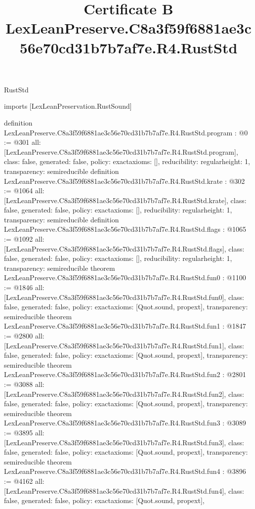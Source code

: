 \begin{lexlean}{RustStd}
\title{Certificate B LexLeanPreserve.C8a3f59f6881ae3c56e70cd31b7b7af7e.R4.RustStd}
\begin{coremodule}
imports [LexLeanPreservation.RustSound]

definition LexLeanPreserve.C8a3f59f6881ae3c56e70cd31b7b7af7e.R4.RustStd.program : @0 := @301 {
  all: [LexLeanPreserve.C8a3f59f6881ae3c56e70cd31b7b7af7e.R4.RustStd.program],
  class: false,
  generated: false,
  policy: exact{axioms: []},
  reducibility: regular{height: 1},
  transparency: semireducible
}
definition LexLeanPreserve.C8a3f59f6881ae3c56e70cd31b7b7af7e.R4.RustStd.krate : @302 := @1064 {
  all: [LexLeanPreserve.C8a3f59f6881ae3c56e70cd31b7b7af7e.R4.RustStd.krate],
  class: false,
  generated: false,
  policy: exact{axioms: []},
  reducibility: regular{height: 1},
  transparency: semireducible
}
definition LexLeanPreserve.C8a3f59f6881ae3c56e70cd31b7b7af7e.R4.RustStd.flags : @1065 := @1092 {
  all: [LexLeanPreserve.C8a3f59f6881ae3c56e70cd31b7b7af7e.R4.RustStd.flags],
  class: false,
  generated: false,
  policy: exact{axioms: []},
  reducibility: regular{height: 1},
  transparency: semireducible
}
theorem LexLeanPreserve.C8a3f59f6881ae3c56e70cd31b7b7af7e.R4.RustStd.fun0 : @1100 := @1846 {
  all: [LexLeanPreserve.C8a3f59f6881ae3c56e70cd31b7b7af7e.R4.RustStd.fun0],
  class: false,
  generated: false,
  policy: exact{axioms: [Quot.sound, propext]},
  transparency: semireducible
}
theorem LexLeanPreserve.C8a3f59f6881ae3c56e70cd31b7b7af7e.R4.RustStd.fun1 : @1847 := @2800 {
  all: [LexLeanPreserve.C8a3f59f6881ae3c56e70cd31b7b7af7e.R4.RustStd.fun1],
  class: false,
  generated: false,
  policy: exact{axioms: [Quot.sound, propext]},
  transparency: semireducible
}
theorem LexLeanPreserve.C8a3f59f6881ae3c56e70cd31b7b7af7e.R4.RustStd.fun2 : @2801 := @3088 {
  all: [LexLeanPreserve.C8a3f59f6881ae3c56e70cd31b7b7af7e.R4.RustStd.fun2],
  class: false,
  generated: false,
  policy: exact{axioms: [Quot.sound, propext]},
  transparency: semireducible
}
theorem LexLeanPreserve.C8a3f59f6881ae3c56e70cd31b7b7af7e.R4.RustStd.fun3 : @3089 := @3895 {
  all: [LexLeanPreserve.C8a3f59f6881ae3c56e70cd31b7b7af7e.R4.RustStd.fun3],
  class: false,
  generated: false,
  policy: exact{axioms: [Quot.sound, propext]},
  transparency: semireducible
}
theorem LexLeanPreserve.C8a3f59f6881ae3c56e70cd31b7b7af7e.R4.RustStd.fun4 : @3896 := @4162 {
  all: [LexLeanPreserve.C8a3f59f6881ae3c56e70cd31b7b7af7e.R4.RustStd.fun4],
  class: false,
  generated: false,
  policy: exact{axioms: [Quot.sound, propext]},
}
\end{coremodule}
\end{lexlean}
